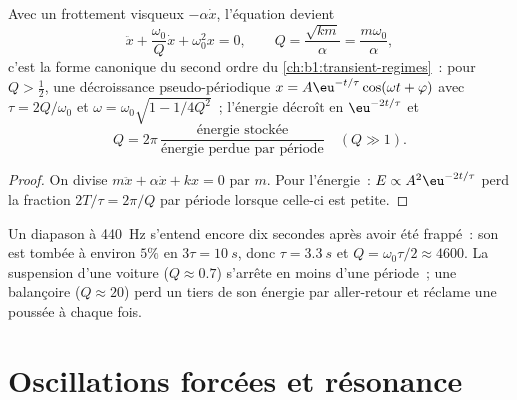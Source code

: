 \begin{proposition}\label{prop:b1:oscillators-resonance:damped}
Avec un frottement visqueux $-\alpha\dot x$, l'équation devient
\[
\ddot x + \frac{\omega_0}{Q}\dot x + \omega_0^2x = 0, \qquad
Q = \frac{\sqrt{km}}{\alpha} = \frac{m\omega_0}{\alpha},
\]
c'est la forme canonique du second ordre du
\cref{ch:b1:transient-regimes}~: pour $Q > \tfrac12$, une décroissance
pseudo-périodique $x = A\eu^{-t/\tau}\cos(\omega t +
\varphi)$ avec $\tau = 2Q/\omega_0$ et $\omega = \omega_0\sqrt{1 - 1/4Q^2}$~;
l'énergie décroît en $\eu^{-2t/\tau}$ et
\[
Q = 2\pi\,\frac{\text{énergie stockée}}{\text{énergie perdue par période}}
\quad (Q \gg 1) .
\]
\end{proposition}

\begin{proof}
On divise $m\ddot x + \alpha\dot x + kx = 0$ par $m$. Pour l'énergie~: $E
\propto A^2\eu^{-2t/\tau}$ perd la fraction $2T/\tau = 2\pi/Q$ par
période lorsque celle-ci est petite.
\end{proof}

\begin{example}\label{ex:b1:oscillators-resonance:ringing}
Un diapason à \qty{440}{Hz} s'entend encore dix secondes après avoir été
frappé~: son  est tombée à environ $5\%$ en $3\tau = \qty{10}{s}$,
donc $\tau = \qty{3.3}{s}$ et $Q = \omega_0\tau/2 \approx 4600$. La
suspension d'une voiture ($Q \approx 0.7$) s'arrête en moins d'une
période~; une balançoire ($Q \approx 20$) perd un tiers de son énergie
par aller-retour et réclame une poussée à chaque fois.
\end{example}

\section{Oscillations forcées et résonance}

